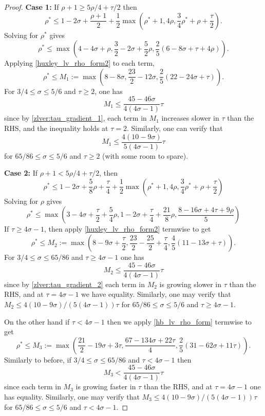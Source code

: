 \begin{proof}
\textbf{Case 1:} If $\rho + 1 \ge 5\rho/4 + \tau/2$ then 
\[
\rho^* \le 1 -2\sigma + \frac{\rho + 1}{2} + \frac{1}{2}\max(\rho^* + 1, 4\rho, \frac{3}{4}\rho^*+\rho +\frac{\tau}{2}).
\]
Solving for $\rho^*$ gives 
\[
\rho^* \le \max(4 - 4\sigma + \rho, \frac{3}{2} - 2\sigma + \frac{5}{2}\rho, \frac{2}{5}(6 - 8\sigma + \tau + 4\rho)).
\]
Applying \eqref{huxley_lv_rho_form2} to each term,
\[
\rho^* \le M_1 := \max(8 - 8\sigma, \frac{23}{2} - 12\sigma, \frac{2}{5}(22 - 24\sigma + \tau)).
\]
For $3/4 \le \sigma \le 5/6$ and $\tau \ge 2$, one has 
\[
M_1 \le \frac{45 - 46\sigma}{4(4\sigma - 1)}\tau
\]
since by \eqref{zlver:tau_gradient_1}, each term in $M_1$ increases slower in $\tau$ than the RHS, and the inequality holds at $\tau = 2$. Similarly, one can verify that
\[
M_1 \le \frac{4(10 - 9\sigma)}{5(4\sigma - 1)}\tau
\]
for $65/86 \le \sigma \le 5/6$ and $\tau \ge 2$ (with some room to spare). 

\textbf{Case 2:} If $\rho + 1 < 5\rho/4 + \tau/2$, then  
\[
\rho^* \le 1 - 2\sigma + \frac{5}{8}\rho + \frac{\tau}{4} + \frac{1}{2}\max(\rho^* + 1, 4\rho, \frac{3}{4}\rho^*+\rho +\frac{\tau}{2})
\]
Solving for $\rho$ gives 
\[
\rho^* \le \max(3 - 4\sigma + \frac{\tau}{2} + \frac{5}{4}\rho, 1 - 2\sigma + \frac{\tau}{4} + \frac{21}{8}\rho, \frac{8 - 16\sigma + 4\tau + 9\rho}{5})
\]
If $\tau \ge 4\sigma - 1$, then apply \eqref{huxley_lv_rho_form2} termwise to get 
\[
\rho^* \le M_2 := \max(8 - 9\sigma + \frac{\tau}{2}, \frac{23}{2} - \frac{25}{2} + \frac{\tau}{4}, \frac{4}{5}(11 - 13 \sigma + \tau)).
\]
For $3/4 \le \sigma \le 65/86$ and $\tau \ge 4\sigma - 1$ one has 
\[
M_2 \le \frac{45 - 46\sigma}{4(4\sigma - 1)}\tau
\]
since by \eqref{zlver:tau_gradient_2} each term in $M_2$ is growing slower in $\tau$ than the RHS, and at $\tau = 4\sigma - 1$ we have equality. Similarly, one may verify that $M_2 \le 4(10 - 9\sigma)/(5(4\sigma - 1))\tau$ for $65/86 \le \sigma \le 5/6$ and $\tau \ge 4\sigma - 1$. 

On the other hand if $\tau < 4\sigma - 1$ then we apply \eqref{hb_lv_rho_form} termwise to get 
\[
\rho^* \le M_3 := \max(\frac{21}{2} - 19\sigma + 3\tau, \frac{67 -134\sigma + 22\tau}{4}, \frac{2}{5}(31 - 62\sigma + 11\tau)).
\]
Similarly to before, if $3/4 \le \sigma \le 65/86$ and $\tau < 4\sigma - 1$ then 
\[
M_3 < \frac{45 - 46\sigma}{4(4\sigma - 1)}\tau
\]
since each term in $M_3$ is growing faster in $\tau$ than the RHS, and at $\tau = 4\sigma - 1$ one has equality. Similarly, one may verify that $M_3 \le 4(10 - 9\sigma)/(5(4\sigma - 1))\tau$ for $65/86 \le \sigma \le 5/6$ and $\tau < 4\sigma - 1$. 


\end{proof}
